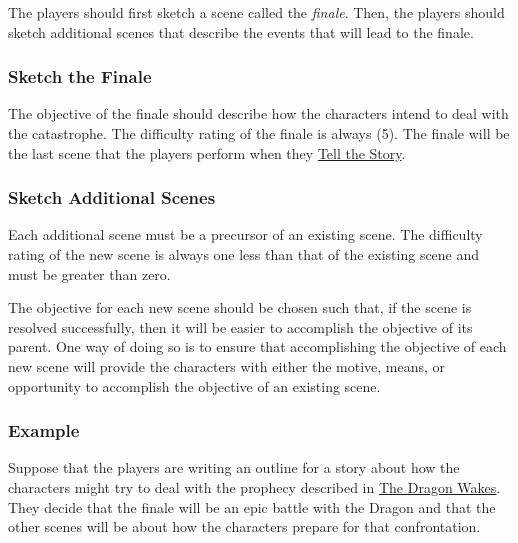 \documentclass[12pt, a5paper, parskip=half-]{scrartcl}
\begin{document}
The players should first sketch a scene called the \emph{finale}.
Then, the players should sketch additional scenes that describe the events that will lead to the finale.

\subsubsection*{Sketch the Finale} \label{subsubsection:sketch-the-finale}
The objective of the finale should describe how the characters intend to deal with the catastrophe.
The difficulty rating of the finale is always (5).
The finale will be the last scene that the players perform when they \hyperref[subsection:tell-the-story]{\cinzel \small Tell the Story}.

\subsubsection*{Sketch Additional Scenes} \label{subsubsection:sketch-additional-scenes}
Each additional scene must be a precursor of an existing scene.
The difficulty rating of the new scene is always one less than that of the existing scene and must be greater than zero.

The objective for each new scene should be chosen such that, if the scene is resolved successfully, then it will be easier to accomplish the objective of its parent. One way of doing so is to ensure that accomplishing the objective of each new scene will provide the characters with either the motive, means, or opportunity to accomplish the objective of an existing scene.

\newpage

\subsubsection*{Example} \label{example:write-an-outline}
Suppose that the players are writing an outline for a story about how the characters might try to deal with the prophecy described in \hyperref[section:the-dragon-wakes]{\cinzel \small The Dragon Wakes}.  They decide that the finale will be an epic battle with the Dragon and that the other scenes will be about how the characters prepare for that confrontation.
\end{document}

